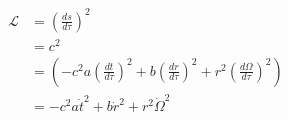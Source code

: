 \documentclass{article}      %
\newcommand{\LL}[0]{\mathcal{L}}
\newcommand{\PD}[2]{\frac{\partial {#2}}{\partial {#1}}}
\newcommand{\dotOmega}[0]{\dot{\Omega}}
\newcommand{\CC}[0]{c^2}
\newcommand{\adot}[0]{\dot{a}}
\newcommand{\tdot}[0]{\dot{t}}
\newcommand{\tddot}[0]{\ddot{t}}
\newcommand{\rdot}[0]{\dot{r}}
\newcommand{\rddot}[0]{\ddot{r}}
\begin{document}
\begin{align*}%
\LL
&= \left(\frac{ds}{d\tau}\right)^2 \\
&= c^2 \\
&= \left( -\CC a \left(\frac{dt}{d\tau}\right)^2 + {b} \left(\frac{dr}{d\tau}\right)^2 + r^2\left(\frac{d\Omega}{d\tau}\right)^2 \right) \\
&= -\CC a \tdot^2 + {b} \rdot^2 + r^2\dotOmega^2 \\
\end{align*}

%
%
%
%
%
%
%
%
%
%
%
%
%



%
\end{document}

